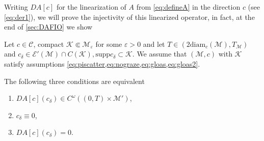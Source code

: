 \documentclass[
	fontsize=11pt, 
	twoside=false, 
	abstract=true, 
	a4paper,
]{scrartcl}
\newcommand{\eps}{\varepsilon}
\newcommand{\RR}{\mathbb{R}}
\newcommand{\DD}{\mathscr{D}}
\newcommand{\del}{\partial}
\newcommand{\supp}{\mathrm{supp}}
\begin{document}
Writing $DA[c]$ for the linearization of $A$ from \cref{eq:defineA} in the direction $c$ (see \cref{eq:der1}), we will prove the injectivity of this linearized operator, in fact, at the end of \cref{sec:DAFIO} we show
%
%
%
%
%
%
%
\begin{theorem}\label{thm:inj}
	Let $c\in\mathcal{C}$, %
	compact $\mathcal{K}\Subset \mathcal{M}_\eps$ for some $\eps>0$ %
	and let $T \in (2\mathrm{diam}_c(\mathcal{M}),T_{\mathcal{M}})$ and $c_\delta \in \mathcal{E}'(\mathcal{M})\cap C(\mathcal{K}), \supp c_\delta \subset \mathcal{K}$. We assume that $(\mathcal{M},c)$ with $\mathcal{K}$ satisfy assumptions \cref{eq:piscatter,eq:nograze,eq:gloas,eq:gloas2}.
	
	The following three conditions are equivalent
	\begin{enumerate}
		\item $DA[c](c_\delta) \in C^\omega((0,T)\times\mathcal{M}')$,
		\item $c_\delta \equiv 0$,
		\item $DA[c](c_\delta) = 0$. 
	\end{enumerate}
%
%
\end{theorem}
\end{document}
